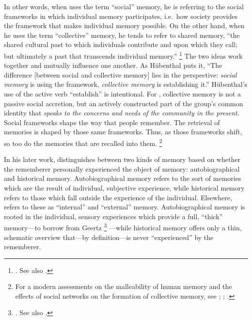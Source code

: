 In other words, when \halbwachs uses the term ``social'' memory, he is referring to the social frameworks in which individual memory participates, i.e.~how society provides the framework that makes individual memory possible.%
    \autocite[180]{hubenthal_carstens-hasselbalch2012}
On the other hand, when he uses the term ``collective'' memory, he tends to refer to shared memory, ``the shared cultural past to which individuals contribute and upon which they call; but ultimately a past that transcends individual memory.''%
    \footnote{%
        \Cite[360]{keith_ec2015}. See also 
        \cite[180]{hubenthal_carstens-hasselbalch2012}.}
The two ideas work together and mutually influence one another. As Hübenthal puts it, ``The difference [between social and collective memory] lies in the perspective: \emph{social memory} is using the framework, \emph{collective memory} is establishing it.''%
    \autocite[180.]{hubenthal_carstens-hasselbalch2012}
Hübenthal's use of the active verb ``establish'' is intentional. For \halbwachs, collective memory is not a passive social accretion, but an actively constructed part of the group's common identity that \emph{speaks to the concerns and needs of the community in the present}. Social frameworks shape the way that people remember. The retrieval of memories is shaped by those same frameworks. Thus, as those frameworks shift, so too do the memories that are recalled into them.%
    \footnote{%
        For a modern assessments on the malleability of human memory and the effects of social networks on the formation of collective memory, see 
        \cite{coman-etal_pnas2016}; 
        \cite{yamashiro-hirst_jarmc2014}; 
        \cite{coman-etal_yang-etal2012}.}

In his later work, \halbwachs distinguishes between two kinds of memory based on whether the rememberer personally experienced the object of memory: autobiographical and historical memory.%
    \autocite[52]{halbwachs1980}
Autobiographical memory refers to the sort of memories which are the result of individual, subjective experience, while historical memory refers to those which fall outside the experience of the individual. Elsewhere, \halbwachs refers to these as ``internal'' and ``external'' memory. Autobiographical memory is rooted in the individual, sensory experiences which provide a full, ``thick'' memory---to borrow from Geertz%
    \footnote{%
        \Cite[3--30]{geertz1973}. See also 
        \cite[189--192]{smith-riley2009}.}%
---while historical memory offers only a thin, schematic overview that---by definition---is never ``experienced'' by the rememberer.  

